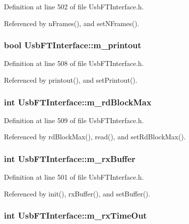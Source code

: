 Definition at line 502 of file UsbFTInterface.h.

Referenced by nFrames(), and setNFrames().\hypertarget{classUsbFTInterface_aa4d5f5ffb4d3b26f1effdf84087aea91}{
\subsubsection[{m\_\-printout}]{\setlength{\rightskip}{0pt plus 5cm}bool {\bf UsbFTInterface::m\_\-printout}}}
\label{classUsbFTInterface_aa4d5f5ffb4d3b26f1effdf84087aea91}


Definition at line 508 of file UsbFTInterface.h.

Referenced by printout(), and setPrintout().\hypertarget{classUsbFTInterface_a0f5050f1ed93392c8e5e4acaf7b75e1c}{
\subsubsection[{m\_\-rdBlockMax}]{\setlength{\rightskip}{0pt plus 5cm}int {\bf UsbFTInterface::m\_\-rdBlockMax}}}
\label{classUsbFTInterface_a0f5050f1ed93392c8e5e4acaf7b75e1c}


Definition at line 509 of file UsbFTInterface.h.

Referenced by rdBlockMax(), read(), and setRdBlockMax().\hypertarget{classUsbFTInterface_a7007c5112d381f5caefa133a42bd900d}{
\subsubsection[{m\_\-rxBuffer}]{\setlength{\rightskip}{0pt plus 5cm}int {\bf UsbFTInterface::m\_\-rxBuffer}}}
\label{classUsbFTInterface_a7007c5112d381f5caefa133a42bd900d}


Definition at line 501 of file UsbFTInterface.h.

Referenced by init(), rxBuffer(), and setBuffer().\hypertarget{classUsbFTInterface_a0153d99857eaa634e4b9fc1ec58caf52}{
\subsubsection[{m\_\-rxTimeOut}]{\setlength{\rightskip}{0pt plus 5cm}int {\bf UsbFTInterface::m\_\-rxTimeOut}}}
\label{classUsbFTInterface_a0153d99857eaa634e4b9fc1ec58caf52}


